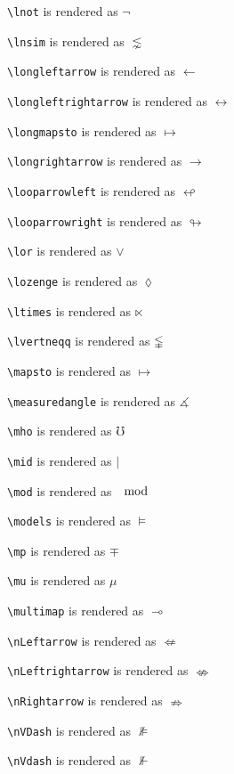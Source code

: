 \texttt{\textbackslash lnot} is rendered as $\lnot$

\texttt{\textbackslash lnsim} is rendered as $\lnsim$

\texttt{\textbackslash longleftarrow} is rendered as $\longleftarrow$

\texttt{\textbackslash longleftrightarrow} is rendered as $\longleftrightarrow$

\texttt{\textbackslash longmapsto} is rendered as $\longmapsto$

\texttt{\textbackslash longrightarrow} is rendered as $\longrightarrow$

\texttt{\textbackslash looparrowleft} is rendered as $\looparrowleft$

\texttt{\textbackslash looparrowright} is rendered as $\looparrowright$

\texttt{\textbackslash lor} is rendered as $\lor$

\texttt{\textbackslash lozenge} is rendered as $\lozenge$

\texttt{\textbackslash ltimes} is rendered as $\ltimes$

\texttt{\textbackslash lvertneqq} is rendered as $\lvertneqq$

\texttt{\textbackslash mapsto} is rendered as $\mapsto$

\texttt{\textbackslash measuredangle} is rendered as $\measuredangle$

\texttt{\textbackslash mho} is rendered as $\mho$

\texttt{\textbackslash mid} is rendered as $\mid$

\texttt{\textbackslash mod} is rendered as $\mod$

\texttt{\textbackslash models} is rendered as $\models$

\texttt{\textbackslash mp} is rendered as $\mp$

\texttt{\textbackslash mu} is rendered as $\mu$

\texttt{\textbackslash multimap} is rendered as $\multimap$

\texttt{\textbackslash nLeftarrow} is rendered as $\nLeftarrow$

\texttt{\textbackslash nLeftrightarrow} is rendered as $\nLeftrightarrow$

\texttt{\textbackslash nRightarrow} is rendered as $\nRightarrow$

\texttt{\textbackslash nVDash} is rendered as $\nVDash$

\texttt{\textbackslash nVdash} is rendered as $\nVdash$


